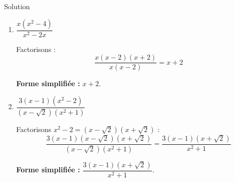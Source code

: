 \documentclass[a4paper,12pt]{article}
\begin{document}
\begin{solutionbox}{Solution}
\begin{enumerate}
    \textbf{Forme simplifiée :} \( x + 2 \).

    \item \( \dfrac{x(x^2 - 4)}{x^2 - 2x} \)

    Factorisons :
    \[
    \dfrac{x(x - 2)(x + 2)}{x(x - 2)} = x + 2
    \]

    \textbf{Forme simplifiée :} \( x + 2 \).

    \item \( \dfrac{3(x - 1)(x^2 - 2)}{(x - \sqrt{2})(x^2 + 1)} \)

    Factorisons \( x^2 - 2 = (x - \sqrt{2})(x + \sqrt{2}) \) :
    \[
    \dfrac{3(x - 1)(x - \sqrt{2})(x + \sqrt{2})}{(x - \sqrt{2})(x^2 + 1)} = \dfrac{3(x - 1)(x + \sqrt{2})}{x^2 + 1}
    \]

    \textbf{Forme simplifiée :} \( \dfrac{3(x - 1)(x + \sqrt{2})}{x^2 + 1} \).

\end{enumerate}
\end{solutionbox}
\end{document}
